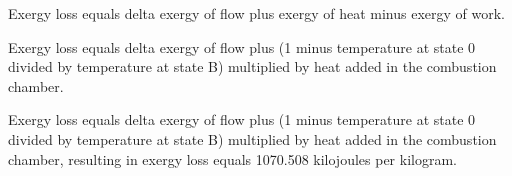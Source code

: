 Exergy loss equals delta exergy of flow plus exergy of heat minus exergy of work.  

Exergy loss equals delta exergy of flow plus (1 minus temperature at state 0 divided by temperature at state B) multiplied by heat added in the combustion chamber.  

Exergy loss equals delta exergy of flow plus (1 minus temperature at state 0 divided by temperature at state B) multiplied by heat added in the combustion chamber, resulting in exergy loss equals 1070.508 kilojoules per kilogram.